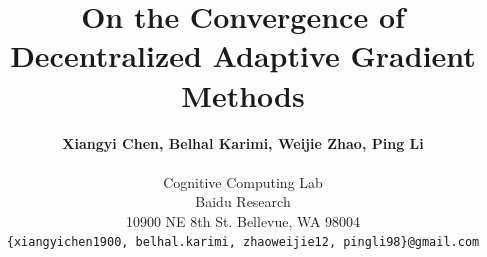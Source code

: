 \documentclass[11pt]{article}
\begin{document}
\title{\bf On the Convergence of Decentralized Adaptive Gradient Methods}

\author{\textbf{Xiangyi Chen, Belhal Karimi, Weijie Zhao, Ping Li}\\\\
Cognitive Computing Lab\\
Baidu Research\\
10900 NE 8th St. Bellevue, WA 98004\\
\texttt{\{xiangyichen1900, belhal.karimi, zhaoweijie12, pingli98\}@gmail.com}
}

\date{}

\maketitle

\end{document}
